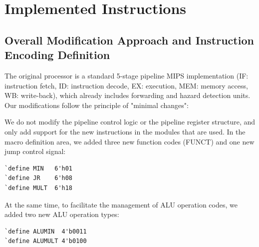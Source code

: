 \documentclass[conference]{IEEEtran}
\begin{document}
\section{Implemented Instructions}
\subsection{Overall Modification Approach and Instruction Encoding Definition}
The original processor is a standard 5-stage pipeline MIPS implementation (IF: instruction fetch, ID: instruction decode, EX: execution, MEM: memory access, WB: write-back), which already includes forwarding and hazard detection units. Our modifications follow the principle of "minimal changes":

We do not modify the pipeline control logic or the pipeline register structure, and only add support for the new instructions in the modules that are used. In the macro definition area, we added three new function codes (FUNCT) and one new jump control signal:

\begin{verbatim}
`define MIN   6'h01
`define JR    6'h08
`define MULT  6'h18
\end{verbatim}

At the same time, to facilitate the management of ALU operation codes, we added two new ALU operation types:

\begin{verbatim}
`define ALUMIN  4'b0011
`define ALUMULT 4'b0100
\end{verbatim}
\end{document}
